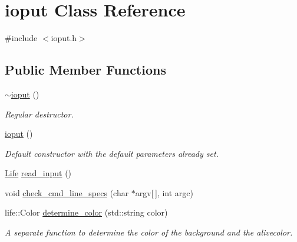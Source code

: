 \hypertarget{classioput}{}\section{ioput Class Reference}
\label{classioput}


{\ttfamily \#include $<$ioput.\+h$>$}

\subsection*{Public Member Functions}
\begin{DoxyCompactItemize}
\item 
\mbox{\label{classioput_aea5a1bca65c2913493bd833d4007f389}} 
\hyperlink{classioput_aea5a1bca65c2913493bd833d4007f389}{$\sim$ioput} ()
\begin{DoxyCompactList}\small\item\em Regular destructor. \end{DoxyCompactList}\item 
\mbox{\label{classioput_aecb5d404c1b54f68e81b74d386ec897e}} 
\hyperlink{classioput_aecb5d404c1b54f68e81b74d386ec897e}{ioput} ()
\begin{DoxyCompactList}\small\item\em Default constructor with the default parameters already set. \end{DoxyCompactList}\item 
\hyperlink{structLife}{Life} \hyperlink{classioput_a8d0f8f175f48d2102e99483b6f1181ed}{read\+\_\+input} ()
\item 
void \hyperlink{classioput_affa8f83e3d696f8b083d69c062f45bed}{check\+\_\+cmd\+\_\+line\+\_\+specs} (char $\ast$argv\mbox{[}$\,$\mbox{]}, int argc)
\item 
\mbox{\label{classioput_a577216089b6dafa42ebd5179783e19c5}} 
life\+::\+Color \hyperlink{classioput_a577216089b6dafa42ebd5179783e19c5}{determine\+\_\+color} (std\+::string color)
\begin{DoxyCompactList}\small\item\em A separate function to determine the color of the background and the alivecolor. \end{DoxyCompactList}\item 
\mbox{\label{classioput_aee27ef187bdf606056e364ff03604d7b}} 

\end{DoxyCompactItemize}
